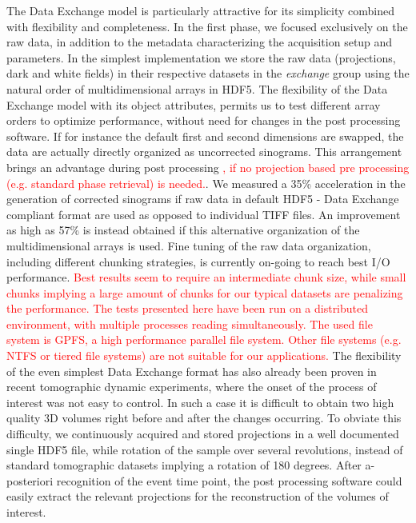 \documentclass[pdf]{iucr}              %
\begin{document}
The Data Exchange model is particularly attractive for its simplicity combined with flexibility and completeness. In the first phase, we focused exclusively on the raw data, in addition to the metadata characterizing the acquisition setup and parameters. In the simplest implementation we store the raw data (projections, dark and white fields) in their respective datasets in the \emph{exchange} group using the natural order of multidimensional arrays in HDF5. The flexibility of the Data Exchange model with its object attributes, permits us to test different array orders to optimize performance, without need for changes in the post processing software. If for instance the default first and second dimensions are swapped, the data are actually directly organized as uncorrected sinograms. This arrangement brings an advantage during post processing \textcolor{red}{, if no projection based pre processing (e.g. standard phase retrieval) is needed.}. We measured a 35\% acceleration in the generation of corrected sinograms if raw data in default HDF5 - Data Exchange compliant format are used as opposed to individual TIFF files. An improvement as high as 57\% is instead obtained if this alternative organization of the multidimensional arrays is used. Fine tuning of the raw data organization, including different chunking strategies, is currently on-going to reach best I/O performance. \textcolor{red}{ Best results seem to require an intermediate chunk size, while small chunks implying a large amount of chunks for our typical datasets are penalizing the performance. The tests presented here have been run on a distributed environment, with multiple processes reading simultaneously. The used file system is GPFS, a high performance parallel file system. Other file systems (e.g. NTFS or tiered file systems) are not suitable for our applications.}
The flexibility of the even simplest Data Exchange format has also already been proven in recent tomographic dynamic experiments, where the onset of the process of interest was not easy to control. In such a case it is difficult to obtain two high quality 3D volumes right before and after the changes occurring. To obviate this difficulty, we continuously acquired and stored projections in a well documented single HDF5 file, while rotation of the sample over several revolutions, instead of standard tomographic datasets implying a rotation of 180 degrees. After a-posteriori recognition of the event time point, the post processing software could easily extract the relevant projections for the reconstruction of the volumes of interest. 
\end{document}
